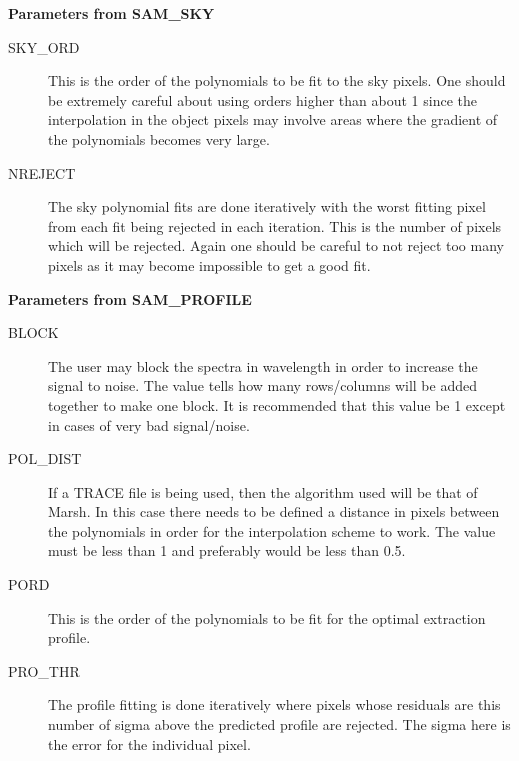 {\bf Parameters from SAM\_SKY}

\begin{description}
\begin{description}

\item[SKY\_ORD] This is the order of the polynomials to be fit to the sky
pixels.  One should be extremely careful about using orders higher than about
1 since the interpolation in the object pixels may involve areas where the
gradient of the polynomials becomes very large.

\item[NREJECT]  The sky polynomial fits are done iteratively with the worst
fitting pixel from each fit being rejected in each iteration.  This is the
number of pixels which will be rejected.  Again one should be careful to not
reject too many pixels as it may become impossible to get a good fit.

\end{description}
\end{description}

{\bf Parameters from SAM\_PROFILE}

\begin{description}
\begin{description}

\item[BLOCK] The user may block the spectra in wavelength in order to increase
the signal to noise.  The value tells how many rows/columns will be added
together to make one block. It is recommended that this value be 1 except in
cases of very bad signal/noise.

\item[POL\_DIST]  If a TRACE file is being used, then the algorithm used will
be that of Marsh.  In this case there needs to be defined a distance in pixels
between the polynomials in order for the interpolation scheme to work.  The
value must be less than 1 and preferably would be less than 0.5.

\item[PORD] This is the order of the polynomials to be fit for the optimal
extraction profile.

\item[PRO\_THR]  The profile fitting is done iteratively where pixels whose
residuals are this number of sigma above the predicted profile are rejected.
The sigma here is the error for the individual pixel.

\end{description}
\end{description}


